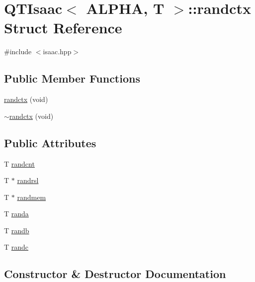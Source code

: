 \hypertarget{structQTIsaac_1_1randctx}{}\section{Q\+T\+Isaac$<$ A\+L\+P\+HA, T $>$\+:\+:randctx Struct Reference}
\label{structQTIsaac_1_1randctx}


{\ttfamily \#include $<$isaac.\+hpp$>$}

\subsection*{Public Member Functions}
\begin{DoxyCompactItemize}
\item 
\hyperlink{structQTIsaac_1_1randctx_ae4933d25b0646108bca5081fa3d88fe2}{randctx} (void)
\item 
\hyperlink{structQTIsaac_1_1randctx_a10c2275a173a11614314467047fdf501}{$\sim$randctx} (void)
\end{DoxyCompactItemize}
\subsection*{Public Attributes}
\begin{DoxyCompactItemize}
\item 
T \hyperlink{structQTIsaac_1_1randctx_a0c19ff0fb95d3c0628bff741c69c7d66}{randcnt}
\item 
T $\ast$ \hyperlink{structQTIsaac_1_1randctx_ab0fb9debfb0c947147b1b4f8e17af4e6}{randrsl}
\item 
T $\ast$ \hyperlink{structQTIsaac_1_1randctx_a0dd373f69839d6cdc2b4473d92c868fc}{randmem}
\item 
T \hyperlink{structQTIsaac_1_1randctx_abdf0625b9f67bf4b7975b2c71034c796}{randa}
\item 
T \hyperlink{structQTIsaac_1_1randctx_a81edd6909f37e2e41aadf88808c9fd30}{randb}
\item 
T \hyperlink{structQTIsaac_1_1randctx_a5444c6614cfccf60600d2b1661957155}{randc}
\end{DoxyCompactItemize}


\subsection{Constructor \& Destructor Documentation}
\mbox{\label{structQTIsaac_1_1randctx_ae4933d25b0646108bca5081fa3d88fe2}} 
